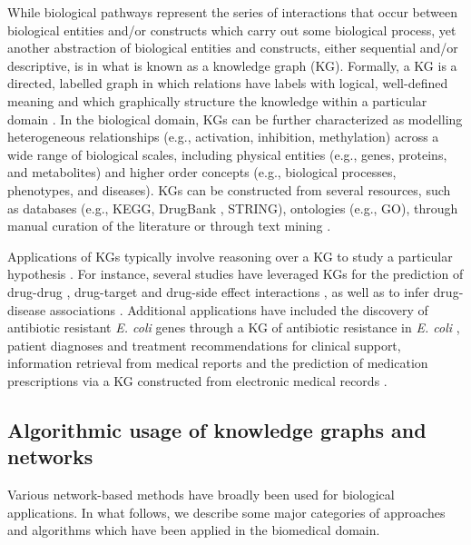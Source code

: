 While biological pathways represent the series of interactions that occur between biological entities and/or constructs which carry out some biological process, yet another abstraction of biological entities and constructs, either sequential and/or descriptive, is in what is known as a knowledge graph (KG). Formally, a KG is a directed, labelled graph in which relations have labels with logical, well-defined meaning and which graphically structure the knowledge within a particular domain \parencite{kg2020, ehrlinger2016}. In the biological domain, KGs can be further characterized as modelling heterogeneous relationships (e.g., activation, inhibition, methylation) across a wide range of biological scales, including physical entities (e.g., genes, proteins, and metabolites) and higher order concepts (e.g., biological processes, phenotypes, and diseases). KGs can be constructed from several resources, such as databases (e.g., KEGG, DrugBank \parencite{wishart2018}, STRING), ontologies (e.g., GO), through manual curation of the literature or through text mining \parencite{ashburner2000,nicholson2020}.

Applications of KGs typically involve reasoning over a KG to study a particular hypothesis \parencite{morton2019}. For instance, several studies have leveraged KGs for the prediction of drug-drug \parencite{karim2019,lin2020KG,celebi2019,yu2021,dai2021,abdelaziz2017}, drug-target \parencite{mohamed2019} and drug-side effect interactions \parencite{bean2017,zitnik2018}, as well as to infer drug-disease associations \parencite{dai2015}. Additional applications have included the discovery of antibiotic resistant \textit{E. coli} genes through a KG of antibiotic resistance in \textit{E. coli} \parencite{youn2022}, patient diagnoses and treatment recommendations for clinical support, information retrieval from medical reports and the prediction of medication prescriptions via a KG constructed from electronic medical records \parencite{li2020real}.

\subsection{Algorithmic usage of knowledge graphs and networks}
\label{algorithmic_usage}

Various network-based methods have broadly been used for biological applications. In what follows, we describe some major categories of approaches and algorithms which have been applied in the biomedical domain.


